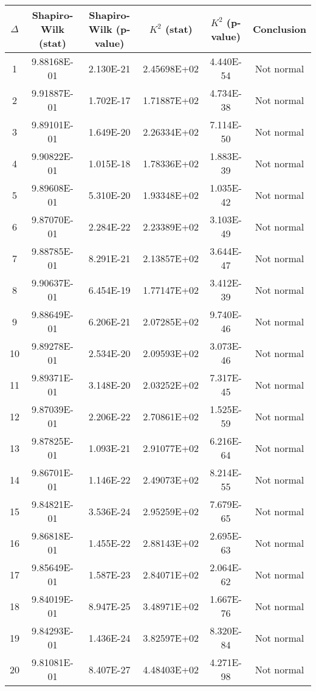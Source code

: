 \begin{table}[h]
	\begin{tabular}{|c|c|c|c|c|c|}
		\hline
		$\Delta$ &  Shapiro-Wilk (stat) & Shapiro-Wilk (p-value) & $K^2$ (stat) & $K^2$ (p-value) & Conclusion\\\hline
		\hline
		1 & 9.88168E-01 & 2.130E-21 & 2.45698E+02 & 4.440E-54 & Not normal\\\hline
		2 & 9.91887E-01 & 1.702E-17 & 1.71887E+02 & 4.734E-38 & Not normal\\\hline
		3 & 9.89101E-01 & 1.649E-20 & 2.26334E+02 & 7.114E-50 & Not normal\\\hline
		4 & 9.90822E-01 & 1.015E-18 & 1.78336E+02 & 1.883E-39 & Not normal\\\hline
		5 & 9.89608E-01 & 5.310E-20 & 1.93348E+02 & 1.035E-42 & Not normal\\\hline
		6 & 9.87070E-01 & 2.284E-22 & 2.23389E+02 & 3.103E-49 & Not normal\\\hline
		7 & 9.88785E-01 & 8.291E-21 & 2.13857E+02 & 3.644E-47 & Not normal\\\hline
		8 & 9.90637E-01 & 6.454E-19 & 1.77147E+02 & 3.412E-39 & Not normal\\\hline
		9 & 9.88649E-01 & 6.206E-21 & 2.07285E+02 & 9.740E-46 & Not normal\\\hline
		10 & 9.89278E-01 & 2.534E-20 & 2.09593E+02 & 3.073E-46 & Not normal\\\hline
		11 & 9.89371E-01 & 3.148E-20 & 2.03252E+02 & 7.317E-45 & Not normal\\\hline
		12 & 9.87039E-01 & 2.206E-22 & 2.70861E+02 & 1.525E-59 & Not normal\\\hline
		13 & 9.87825E-01 & 1.093E-21 & 2.91077E+02 & 6.216E-64 & Not normal\\\hline
		14 & 9.86701E-01 & 1.146E-22 & 2.49073E+02 & 8.214E-55 & Not normal\\\hline
		15 & 9.84821E-01 & 3.536E-24 & 2.95259E+02 & 7.679E-65 & Not normal\\\hline
		16 & 9.86818E-01 & 1.455E-22 & 2.88143E+02 & 2.695E-63 & Not normal\\\hline
		17 & 9.85649E-01 & 1.587E-23 & 2.84071E+02 & 2.064E-62 & Not normal\\\hline
		18 & 9.84019E-01 & 8.947E-25 & 3.48971E+02 & 1.667E-76 & Not normal\\\hline
		19 & 9.84293E-01 & 1.436E-24 & 3.82597E+02 & 8.320E-84 & Not normal\\\hline
		20 & 9.81081E-01 & 8.407E-27 & 4.48403E+02 & 4.271E-98 & Not normal\\\hline

\end{tabular}
\end{table}
